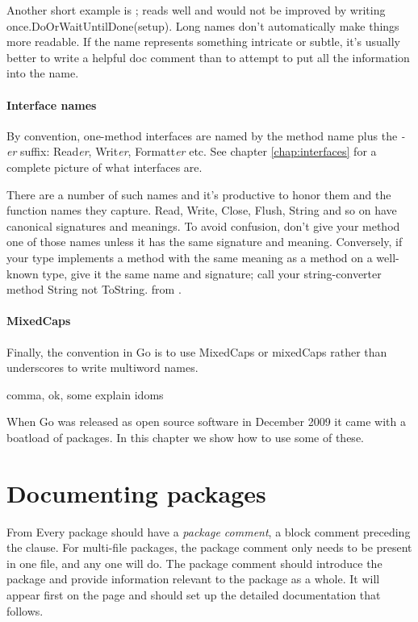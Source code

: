 Another short example is ;  reads well and would
not be improved by writing once.DoOrWaitUntilDone(setup). Long names
don't automatically make things more readable. If the name represents
something intricate or subtle, it's usually better to write a helpful
doc comment than to attempt to put all the information into the name.

\paragraph{Interface names}
By convention, one-method interfaces are named by the method name plus
the \emph{-er} suffix: Read\emph{er}, Writ\emph{er}, Formatt\emph{er} etc. See chapter
\ref{chap:interfaces} for a complete picture of what interfaces are.

There are a number of such names and it's productive to honor them and
the function names they capture. Read, Write, Close, Flush, String and
so on have canonical signatures and meanings. To avoid confusion, don't
give your method one of those names unless it has the same signature and
meaning. Conversely, if your type implements a method with the same
meaning as a method on a well-known type, give it the same name and
signature; call your string-converter method String not ToString.
from \cite{effective_go}.

\paragraph{MixedCaps}
Finally, the convention in Go is to use MixedCaps or mixedCaps rather
than underscores to write multiword names.

comma, ok, some explain idoms




When Go was released as open source software in December 2009 it came
with a boatload of packages. In this chapter we show how to use some
of these.


\section{Documenting packages}
From \cite{effective_go}
Every package should have a \emph{package comment}, a block comment preceding the
  clause. For multi-file packages, the package comment only needs to be
present in one file, and any one will do. The package comment should introduce
the package and provide information relevant to the package as a whole. It will
appear first on the  page and should set up the detailed documentation
that follows.

